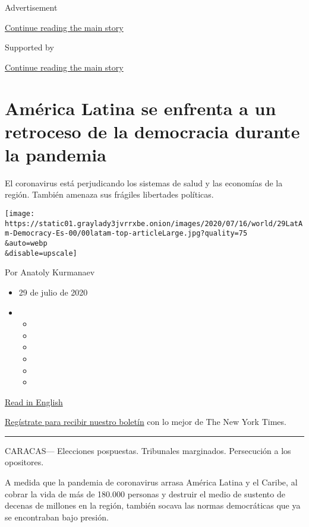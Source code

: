 Advertisement

\protect\hyperlink{after-top}{Continue reading the main story}

Supported by

\protect\hyperlink{after-sponsor}{Continue reading the main story}

\hypertarget{amuxe9rica-latina-se-enfrenta-a-un-retroceso-de-la-democracia-durante-la-pandemia}{%
\section{América Latina se enfrenta a un retroceso de la democracia
durante la
pandemia}\label{amuxe9rica-latina-se-enfrenta-a-un-retroceso-de-la-democracia-durante-la-pandemia}}

El coronavirus está perjudicando los sistemas de salud y las economías
de la región. También amenaza sus frágiles libertades políticas.

\texttt{[image: https://static01.graylady3jvrrxbe.onion/images/2020/07/16/world/29LatAm-Democracy-Es-00/00latam-top-articleLarge.jpg?quality=75\\\&auto=webp\\\&disable=upscale]}

Por Anatoly Kurmanaev

\begin{itemize}
\item
  29 de julio de 2020
\item
  \begin{itemize}
  \item
  \item
  \item
  \item
  \item
  \item
  \end{itemize}
\end{itemize}

\href{https://www.nytimes3xbfgragh.onion/2020/07/29/world/americas/latin-america-democracy-pandemic.html}{Read
in English}

\href{https://www.nytimes3xbfgragh.onion/newsletters/el-times}{Regístrate
para recibir nuestro boletín} con lo mejor de The New York Times.

\begin{center}\rule{0.5\linewidth}{\linethickness}\end{center}

CARACAS--- Elecciones pospuestas. Tribunales marginados. Persecución a
los opositores.

A medida que la pandemia de coronavirus arrasa América Latina y el
Caribe, al cobrar la vida de más de 180.000 personas y destruir el medio
de sustento de decenas de millones en la región, también socava las
normas democráticas que ya se encontraban bajo presión.

